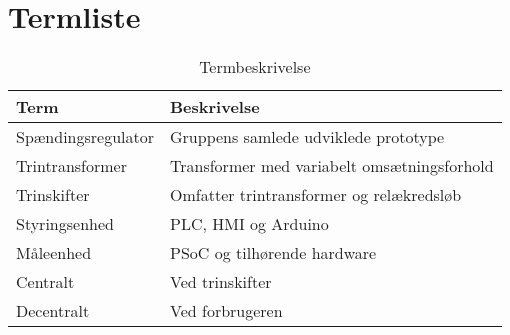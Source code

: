

\section{Termliste}

\begin{table}[htbp]
	\centering
	\begin{tabular}{|l|l|}
		\hline
		\textbf{Term} 	& \textbf{Beskrivelse} \\\hline
		Spændingsregulator	& Gruppens samlede udviklede prototype \\\hline
		Trintransformer	& Transformer med variabelt omsætningsforhold \\\hline
		Trinskifter	& Omfatter trintransformer og relækredsløb  \\\hline
		Styringsenhed	& PLC, HMI og Arduino \\\hline
		Måleenhed	& PSoC og tilhørende hardware \\\hline
		Centralt	& Ved trinskifter \\\hline
		Decentralt 	& Ved forbrugeren \\\hline
		
	\end{tabular}
	\caption{Termbeskrivelse}
	\label{tab:termbeskrivelsen}
	
\end{table}